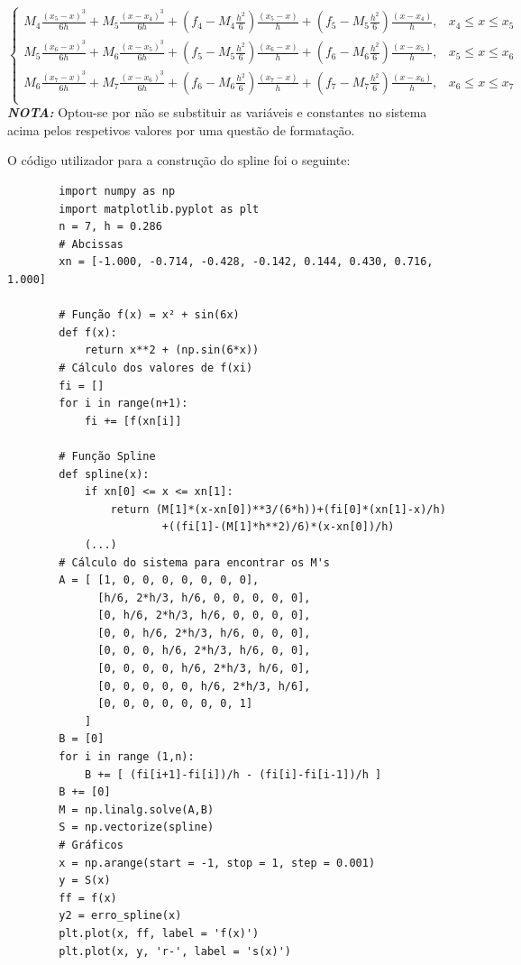 \documentclass[12pt, letterpaper,fleqn]{article}
\begin{document}
\begin{itemize}
\begin{equation}
\begin{cases}
            M_4\frac{(x_5 - x)^3}{6h} + M_5\frac{(x-x_4)^3}{6h}+(f_4 - M_4\frac{h^2}{6})\frac{(x_5 - x)}{h} + (f_5 - M_5\frac{h^2}{6}) \frac{(x-x_4)}{h}, & x_4 \leq x \leq x_5 \\
            
            M_5\frac{(x_6 - x)^3}{6h} + M_6\frac{(x-x_5)^3}{6h}+(f_5 - M_5\frac{h^2}{6})\frac{(x_6 - x)}{h} + (f_6 - M_6\frac{h^2}{6}) \frac{(x-x_5)}{h}, & x_5 \leq x \leq x_6 \\
            
            M_6\frac{(x_7 - x)^3}{6h} + M_7\frac{(x-x_6)^3}{6h}+(f_6 - M_6\frac{h^2}{6})\frac{(x_7 - x)}{h} + (f_7 - M_7\frac{h^2}{6}) \frac{(x-x_6)}{h}, & x_6 \leq x \leq x_7 \\
        \end{cases}    
    \end{equation}
    \textbf{\textit{NOTA:}} Optou-se por não se substituir as variáveis e constantes no sistema acima pelos respetivos valores por uma questão de formatação.
    
    O código utilizador para a construção do spline foi o seguinte:
    \begin{verbatim}
        import numpy as np
        import matplotlib.pyplot as plt 
        n = 7, h = 0.286
        # Abcissas
        xn = [-1.000, -0.714, -0.428, -0.142, 0.144, 0.430, 0.716, 1.000]
        
        # Função f(x) = x² + sin(6x)
        def f(x):
            return x**2 + (np.sin(6*x))
        # Cálculo dos valores de f(xi)
        fi = []
        for i in range(n+1):
            fi += [f(xn[i]]
        
        # Função Spline
        def spline(x):
            if xn[0] <= x <= xn[1]:
                return (M[1]*(x-xn[0])**3/(6*h))+(fi[0]*(xn[1]-x)/h) 
                        +((fi[1]-(M[1]*h**2)/6)*(x-xn[0])/h)
            (...)
        # Cálculo do sistema para encontrar os M's
        A = [ [1, 0, 0, 0, 0, 0, 0, 0],
              [h/6, 2*h/3, h/6, 0, 0, 0, 0, 0],
              [0, h/6, 2*h/3, h/6, 0, 0, 0, 0],
              [0, 0, h/6, 2*h/3, h/6, 0, 0, 0],
              [0, 0, 0, h/6, 2*h/3, h/6, 0, 0],
              [0, 0, 0, 0, h/6, 2*h/3, h/6, 0],
              [0, 0, 0, 0, 0, h/6, 2*h/3, h/6],
              [0, 0, 0, 0, 0, 0, 0, 1]                                
            ]
        B = [0]
        for i in range (1,n):
            B += [ (fi[i+1]-fi[i])/h - (fi[i]-fi[i-1])/h ]
        B += [0]
        M = np.linalg.solve(A,B)
        S = np.vectorize(spline)
        # Gráficos
        x = np.arange(start = -1, stop = 1, step = 0.001)
        y = S(x)
        ff = f(x)
        y2 = erro_spline(x)
        plt.plot(x, ff, label = 'f(x)')
        plt.plot(x, y, 'r-', label = 's(x)')
    \end{verbatim}
    

\end{itemize}
\end{document}
